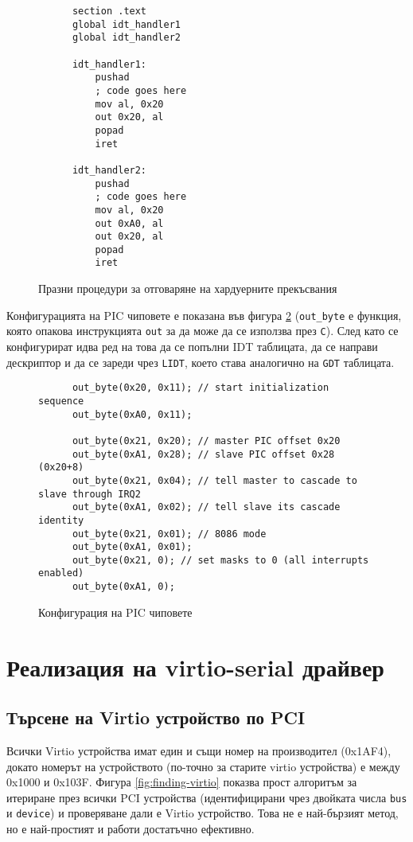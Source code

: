   \begin{figure}[htpb]
    \centering
    \begin{verbatim}
      section .text
      global idt_handler1
      global idt_handler2

      idt_handler1:
          pushad
          ; code goes here
          mov al, 0x20
          out 0x20, al
          popad
          iret

      idt_handler2:
          pushad
          ; code goes here
          mov al, 0x20
          out 0xA0, al
          out 0x20, al
          popad
          iret
    \end{verbatim}
    \caption{Празни процедури за отговаряне на хардуерните прекъсвания}
    \label{fig:irqhandlers}
  \end{figure}

  Конфигурацията на PIC чиповете е показана във фигура \ref{fig:picconfig} ({\tt out\_byte} е функция, която опакова инструкцията {\tt out} за да може да се използва през {\tt C}). След като се конфигурират идва ред на това да се попълни IDT таблицата, да се направи дескриптор и да се зареди чрез {\tt LIDT}, което става аналогично на {\tt GDT} таблицата.

  \begin{figure}[htpb]
    \centering
    \begin{verbatim}
      out_byte(0x20, 0x11); // start initialization sequence
      out_byte(0xA0, 0x11);

      out_byte(0x21, 0x20); // master PIC offset 0x20
      out_byte(0xA1, 0x28); // slave PIC offset 0x28 (0x20+8)
      out_byte(0x21, 0x04); // tell master to cascade to slave through IRQ2
      out_byte(0xA1, 0x02); // tell slave its cascade identity
      out_byte(0x21, 0x01); // 8086 mode
      out_byte(0xA1, 0x01);
      out_byte(0x21, 0); // set masks to 0 (all interrupts enabled)
      out_byte(0xA1, 0);
    \end{verbatim}
    \caption{Конфигурация на PIC чиповете}
    \label{fig:picconfig}
  \end{figure}

\section{Реализация на virtio-serial драйвер}
  \subsection{Търсене на Virtio устройство по PCI}
  Всички Virtio устройства имат един и същи номер на производител (0x1AF4), докато номерът на устройството (по-точно за старите virtio устройства) е между 0x1000 и 0x103F. Фигура \ref{fig:finding-virtio} показва прост алгоритъм за итериране през всички PCI устройства (идентифицирани чрез двойката числа {\tt bus} и {\tt device}) и проверяване дали е Virtio устройство. Това не е най-бързият метод, но е най-простият и работи достатъчно ефективно.

